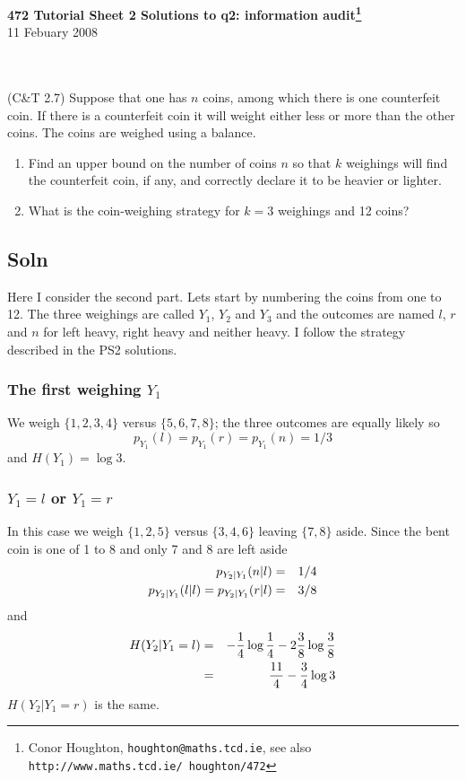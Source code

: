 \documentclass[12pt]{article}
\begin{document}
\begin{center}
{\bf 472 Tutorial Sheet 2 Solutions to q2: information audit\footnote{Conor Houghton, {\tt houghton@maths.tcd.ie}, see also {\tt http://www.maths.tcd.ie/ houghton/472}}}\\[1cm]{} 11 Febuary 2008
\end{center}
\\
\\
(C\&T 2.7) Suppose that one has $n$ coins, among which there is one counterfeit coin. If there is a counterfeit coin it will weight either less or more than the other coins. The coins are weighed using a balance.
\begin{enumerate}
\item Find an upper bound on the number of coins $n$ so that $k$ weighings will find the counterfeit coin, if any, and correctly declare it to be heavier or lighter.
\item What is the coin-weighing strategy for $k=3$ weighings and 12 coins?
\end{enumerate}

\subsection*{Soln} Here I consider the second part. Lets start by numbering the
coins from one to 12. The three weighings are called $Y_1$, $Y_2$ and
$Y_3$ and the outcomes are named $l$, $r$ and $n$ for left heavy,
right heavy and neither heavy. I follow the strategy described in the
PS2 solutions.

\subsubsection*{The first weighing $Y_1$}
We weigh $\{1,2,3,4\}$ versus $\{5,6,7,8\}$; the three outcomes are equally likely so 
\begin{equation}
p_{Y_1}(l)=p_{Y_1}(r)=p_{Y_1}(n)=1/3
\end{equation}
and $H(Y_1)=\log{3}$.

\subsubsection*{$Y_1=l$ or $Y_1=r$}

In this case we weigh $\{1,2,5\}$ versus $\{3,4,6\}$ leaving $\{7,8\}$ aside. Since the bent coin is one of 1 to 8 and only 7 and 8 are left aside
\begin{eqnarray}
p_{Y_2|Y_1}(n|l)&=&1/4\cr
p_{Y_2|Y_1}(l|l)=p_{Y_2|Y_1}(r|l)&=&3/8
\end{eqnarray}
and
\begin{eqnarray}
H(Y_2|Y_1=l)&=&-\frac{1}{4}\log{\frac{1}{4}}-2\frac{3}{8}\log{\frac{3}{8}}\cr
            &=&\frac{11}{4}-\frac{3}{4}\log{3}
\end{eqnarray}
$H(Y_2|Y_1=r)$ is the same.
\end{document}
